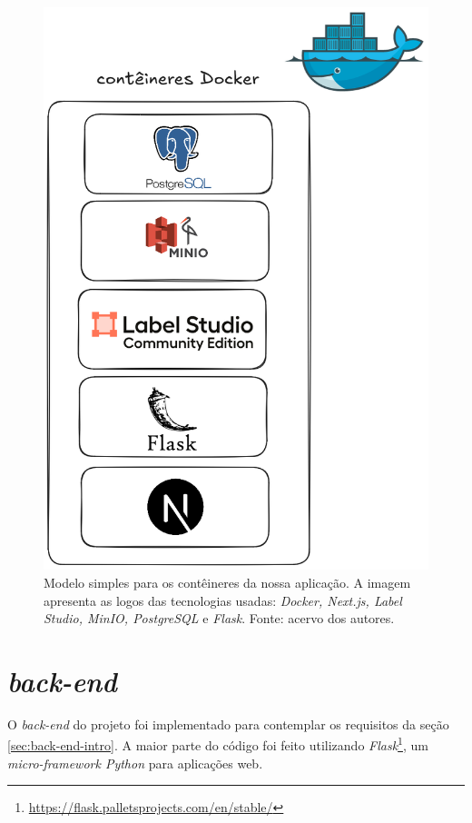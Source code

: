 \begin{figure}[htbp]
    \centering
    \includegraphics[height=0.5\textheight]{images/containers.png}
    \caption{\label{fig:containers} Modelo simples para os contêineres da nossa aplicação. A imagem apresenta as logos das tecnologias usadas: \emph{Docker, Next.js, Label Studio, MinIO, PostgreSQL} e \emph{Flask}. Fonte: acervo dos autores.}
\end{figure}

\section{\emph{back-end}}
O \emph{back-end} do projeto foi implementado para contemplar os requisitos da seção \ref{sec:back-end-intro}. A maior parte do código foi feito utilizando \emph{Flask}\footnote{\url{https://flask.palletsprojects.com/en/stable/}}, um \emph{micro-framework Python} para aplicações web.

